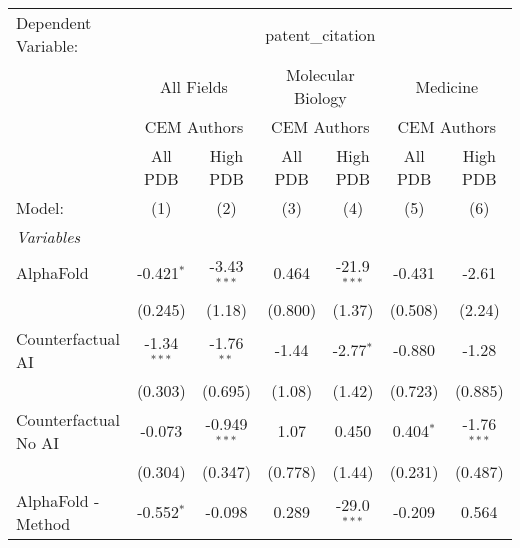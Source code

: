 \begingroup
\centering
\begin{tabular}{lcccccc}
   \tabularnewline \midrule \midrule
   Dependent Variable: & \multicolumn{6}{c}{patent\_citation}\\
 & \multicolumn{2}{c}{All Fields} & \multicolumn{2}{c}{Molecular Biology} & \multicolumn{2}{c}{Medicine} \\
\cmidrule(lr){2-3} \cmidrule(lr){4-5} \cmidrule(lr){6-7}
 & \multicolumn{2}{c}{CEM Authors} & \multicolumn{2}{c}{CEM Authors} & \multicolumn{2}{c}{CEM Authors} \\
\cmidrule(lr){2-3} \cmidrule(lr){4-5} \cmidrule(lr){6-7}
 & \multicolumn{1}{c}{All PDB} & \multicolumn{1}{c}{High PDB} & \multicolumn{1}{c}{All PDB} & \multicolumn{1}{c}{High PDB} & \multicolumn{1}{c}{All PDB} & \multicolumn{1}{c}{High PDB} \\
\cmidrule(lr){2-2} \cmidrule(lr){3-3} \cmidrule(lr){4-4} \cmidrule(lr){5-5} \cmidrule(lr){6-6} \cmidrule(lr){7-7}
   Model:                                                     & (1)            & (2)            & (3)           & (4)           & (5)           & (6)\\  
   \midrule
   \emph{Variables}\\
   AlphaFold                                                  & -0.421$^{*}$   & -3.43$^{***}$  & 0.464         & -21.9$^{***}$ & -0.431        & -2.61\\   
                                                              & (0.245)        & (1.18)         & (0.800)       & (1.37)        & (0.508)       & (2.24)\\   
   Counterfactual AI                                          & -1.34$^{***}$  & -1.76$^{**}$   & -1.44         & -2.77$^{*}$   & -0.880        & -1.28\\   
                                                              & (0.303)        & (0.695)        & (1.08)        & (1.42)        & (0.723)       & (0.885)\\   
   Counterfactual No AI                                       & -0.073         & -0.949$^{***}$ & 1.07          & 0.450         & 0.404$^{*}$   & -1.76$^{***}$\\   
                                                              & (0.304)        & (0.347)        & (0.778)       & (1.44)        & (0.231)       & (0.487)\\   
   AlphaFold - Method                                         & -0.552$^{*}$   & -0.098         & 0.289         & -29.0$^{***}$ & -0.209        & 0.564\\   

\end{tabular}
